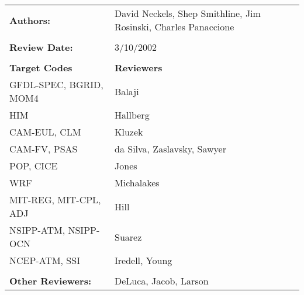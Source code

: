 
\begin{tabular}{l l}

{\bf Authors:} & David Neckels, Shep Smithline, Jim Rosinski, Charles Panaccione \\ \\

{\bf Review Date:}          & 3/10/2002 \\ \\

{\bf Target Codes}            & {\bf Reviewers} \\
GFDL-SPEC, BGRID, MOM4        & Balaji \\ 
HIM                           & Hallberg \\
CAM-EUL, CLM                  & Kluzek \\
CAM-FV, PSAS                  & da Silva, Zaslavsky, Sawyer\\
POP, CICE                     & Jones \\
WRF                           & Michalakes \\
MIT-REG, MIT-CPL, ADJ         & Hill \\
NSIPP-ATM, NSIPP-OCN          & Suarez \\
NCEP-ATM, SSI                 & Iredell, Young \\ \\

{\bf Other Reviewers:}        & DeLuca, Jacob, Larson

\end{tabular}


